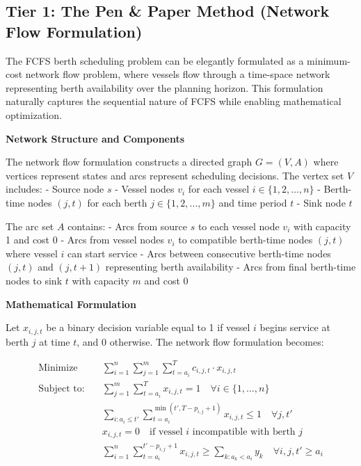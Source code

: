 \documentclass{article}
\begin{document}
\subsection{Tier 1: The Pen \& Paper Method (Network Flow Formulation)}

The FCFS berth scheduling problem can be elegantly formulated as a minimum-cost network flow problem, where vessels flow through a time-space network representing berth availability over the planning horizon. This formulation naturally captures the sequential nature of FCFS while enabling mathematical optimization.

\textbf{Network Structure and Components}

The network flow formulation constructs a directed graph $G = (V, A)$ where vertices represent states and arcs represent scheduling decisions. The vertex set $V$ includes:
- Source node $s$
- Vessel nodes $v_i$ for each vessel $i \in \{1, 2, \ldots, n\}$
- Berth-time nodes $(j, t)$ for each berth $j \in \{1, 2, \ldots, m\}$ and time period $t$
- Sink node $t$

The arc set $A$ contains:
- Arcs from source $s$ to each vessel node $v_i$ with capacity 1 and cost 0
- Arcs from vessel nodes $v_i$ to compatible berth-time nodes $(j, t)$ where vessel $i$ can start service
- Arcs between consecutive berth-time nodes $(j, t)$ and $(j, t+1)$ representing berth availability
- Arcs from final berth-time nodes to sink $t$ with capacity $m$ and cost 0

\textbf{Mathematical Formulation}

Let $x_{i,j,t}$ be a binary decision variable equal to 1 if vessel $i$ begins service at berth $j$ at time $t$, and 0 otherwise. The network flow formulation becomes:

\begin{align}
\text{Minimize} \quad & \sum_{i=1}^{n} \sum_{j=1}^{m} \sum_{t=a_i}^{T} c_{i,j,t} \cdot x_{i,j,t} \\
\text{Subject to:} \quad & \sum_{j=1}^{m} \sum_{t=a_i}^{T} x_{i,j,t} = 1 \quad \forall i \in \{1, \ldots, n\} \\
& \sum_{i: a_i \leq t'} \sum_{t=a_i}^{\min(t', T-p_{i,j}+1)} x_{i,j,t} \leq 1 \quad \forall j, t' \\
& x_{i,j,t} = 0 \quad \text{if vessel } i \text{ incompatible with berth } j \\
& \sum_{i=1}^{n} \sum_{t=a_i}^{t'-p_{i,j}+1} x_{i,j,t} \geq \sum_{k: a_k < a_i} y_k \quad \forall i, j, t' \geq a_i
\end{align}
\end{document}
